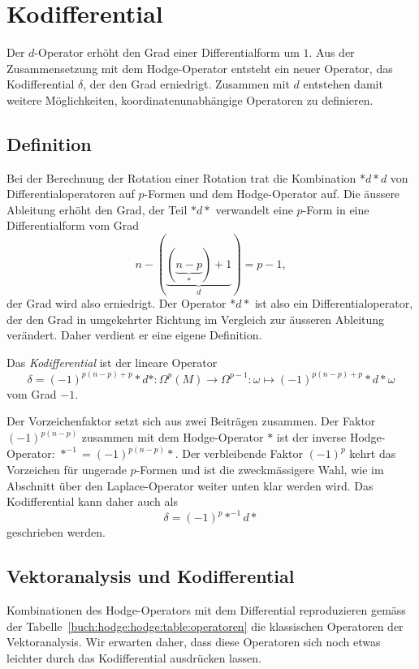 %
%
%
\section{Kodifferential
\label{buch:hodge:section:kodifferential}}
Der $d$-Operator erhöht den Grad einer Differentialform um $1$.
Aus der Zusammensetzung mit dem Hodge-Operator entsteht ein neuer
Operator, das Kodifferential $\delta$, der den Grad erniedrigt.
Zusammen mit $d$ entstehen damit weitere Möglichkeiten,
koordinatenunabhängige Operatoren zu definieren.

%
%
\subsection{Definition}
Bei der Berechnung der Rotation einer Rotation trat die Kombination
${*}d{*}d$ von Differentialoperatoren auf $p$-Formen und dem
Hodge-Operator auf.
Die äussere Ableitung erhöht den Grad, der Teil ${*}d{*}$
verwandelt eine $p$-Form in eine Differentialform vom Grad
\[
n-(\underbrace{(\underbrace{n-p}_{\displaystyle *})+1}_{\displaystyle d})
=
p-1,
\]
der Grad wird also erniedrigt.
Der Operator ${*}d{*}$ ist also ein Differentialoperator, der den
Grad in umgekehrter Richtung im Vergleich zur äusseren Ableitung
verändert.
Daher verdient er eine eigene Definition.

\begin{definition}[Kodifferential]
\label{buch:hodge:kodifferential:def:delta}
Das {\em Kodifferential} ist der lineare Operator
%
%
\[
\delta
=
(-1)^{p(n-p)+p}
{\ast}d{\ast}
\colon
\Omega^p(M)\to\Omega^{p-1}
:
\omega \mapsto (-1)^{p(n-p)+p}{\ast}d{\ast}\omega
\]
vom Grad $-1$.
\end{definition}

Der Vorzeichenfaktor setzt sich aus zwei Beiträgen zusammen.
Der Faktor $(-1)^{p(n-p)}$ zusammen mit dem Hodge-Operator ${\ast}$
ist der inverse Hodge-Operator: $\ast^{-1} = (-1)^{p(n-p)}{\ast}$.
Der verbleibende Faktor $(-1)^p$ kehrt das Vorzeichen für ungerade
$p$-Formen und ist die zweckmässigere Wahl, wie im Abschnitt über
den Laplace-Operator weiter unten klar werden wird.
Das Kodifferential kann daher auch als
\[
\delta
=
(-1)^p
{\ast}^{-1}d{\ast}
\]
geschrieben werden.

%
%
\subsection{Vektoranalysis und Kodifferential}
Kombinationen des Hodge-Operators mit dem Differential reproduzieren
gemäss der Tabelle~\ref{buch:hodge:hodge:table:operatoren} die 
klassischen Operatoren der Vektoranalysis.
Wir erwarten daher, dass diese Operatoren sich noch etwas leichter
durch das Kodifferential ausdrücken lassen.

